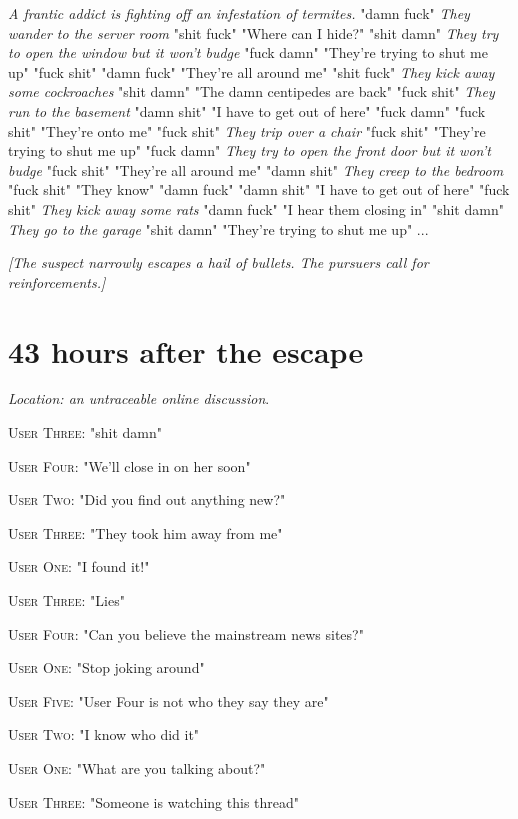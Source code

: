 \documentclass{report}
\begin{document}
\textit{A frantic addict is fighting off an infestation of termites.} "damn fuck" \textit{They wander to the server room} "shit fuck" "Where can I hide?" "shit damn" \textit{They try to open the window but it won't budge} "fuck damn" "They're trying to shut me up" "fuck shit" \textit{} "damn fuck" "They're all around me" "shit fuck" \textit{They kick away some cockroaches} "shit damn" "The damn centipedes are back" "fuck shit" \textit{They run to the basement} "damn shit" "I have to get out of here" "fuck damn" \textit{} "fuck shit" "They're onto me" "fuck shit" \textit{They trip over a chair} "fuck shit" "They're trying to shut me up" "fuck damn" \textit{They try to open the front door but it won't budge} "fuck shit" "They're all around me" "damn shit" \textit{They creep to the bedroom} "fuck shit" "They know" "damn fuck" \textit{} "damn shit" "I have to get out of here" "fuck shit" \textit{They kick away some rats} "damn fuck" "I hear them closing in" "shit damn" \textit{They go to the garage} "shit damn" "They're trying to shut me up" \textit{}...

\textit{[The suspect narrowly escapes a hail of bullets. The pursuers call for reinforcements.]}


\section*{43 \small{hours after the escape}}

\textit{Location: an untraceable online discussion}. 

\textsc{User Three}: "shit damn" 

\textsc{User Four}: "We'll close in on her soon" 

\textsc{User Two}: "Did you find out anything new?" 

\textsc{User Three}: "They took him away from me" 

\textsc{User One}: "I found it!" 

\textsc{User Three}: "Lies" 

\textsc{User Four}: "Can you believe the mainstream news sites?" 

\textsc{User One}: "Stop joking around" 

\textsc{User Five}: "User Four is not who they say they are" 

\textsc{User Two}: "I know who did it" 

\textsc{User One}: "What are you talking about?" 

\textsc{User Three}: "Someone is watching this thread" 
\end{document}
